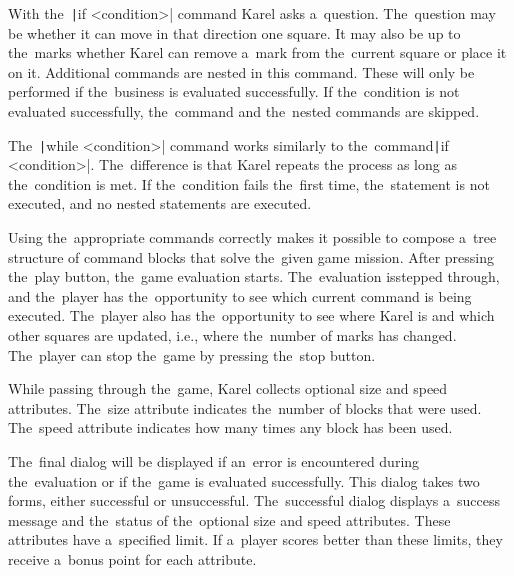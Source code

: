 With the~\texttt|if <condition>| command Karel asks a~question.
The~question may be whether it can move in that direction one square.
It may also be up to the~marks whether Karel can remove a~mark from the~current square or place it on it.
Additional commands are nested in this command.
These will only be performed if the~business is evaluated successfully.
If the~condition is not evaluated successfully, the~command and the~nested commands are skipped.

The~\texttt|while <condition>| command works similarly to the~command\linebreak{}\texttt|if <condition>|.
The~difference is that Karel repeats the process as long as the~condition is met.
If the~condition fails the~first time, the~statement is not executed, and no nested statements are executed.

Using the~appropriate commands correctly makes it possible to compose a~tree structure of command blocks that solve the~given game mission.
\mbox{After} pressing the~play button, the~game evaluation starts.
The~evaluation is\linebreak{}stepped through, and the~player has the~opportunity to see which current command is being executed.
The~player also has the~opportunity to see where Karel is and which other squares are updated, i.e., where the~number of marks has changed.
The~player can stop the~game by pressing the~stop button. 

While passing through the~game, Karel collects optional size and speed attributes.
The~size attribute indicates the~number of blocks that were used.
The~speed attribute indicates how many times any block has been used.

The~final dialog will be displayed if an~error is encountered during the~evaluation or if the~game is evaluated successfully.
This dialog takes two forms, either successful or unsuccessful.
The~successful dialog displays a~success \mbox{message} and the~status of the~optional size and speed attributes.
These \mbox{attributes} have a~specified limit.
If a~player scores better than these limits, they receive a~bonus point for each attribute.